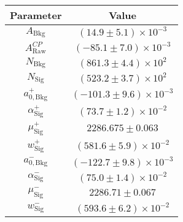 \begin{tabular}{cc}
  \toprule
  Parameter & Value \\
  \midrule
$A_{\mathrm{Bkg}}$ & $(14.9 \pm 5.1) \times 10^{-3}$ \\
$A_{\mathrm{Raw}}^{C\!P}$ & $(-85.1 \pm 7.0) \times 10^{-3}$ \\
$N_{\mathrm{Bkg}}$ & $(861.3 \pm 4.4) \times 10^{2}$ \\
$N_{\mathrm{Sig}}$ & $(523.2 \pm 3.7) \times 10^{2}$ \\
$a_{0,\mathrm{Bkg}}^{+}$ & $(-101.3 \pm 9.6) \times 10^{-3}$ \\
$\alpha_{\mathrm{Sig}}^{+}$ & $(73.7 \pm 1.2) \times 10^{-2}$ \\
$\mu_{\mathrm{Sig}}^{+}$ & $2286.675 \pm 0.063$ \\
$w_{\mathrm{Sig}}^{+}$ & $(581.6 \pm 5.9) \times 10^{-2}$ \\
$a_{0,\mathrm{Bkg}}^{-}$ & $(-122.7 \pm 9.8) \times 10^{-3}$ \\
$\alpha_{\mathrm{Sig}}^{-}$ & $(75.0 \pm 1.4) \times 10^{-2}$ \\
$\mu_{\mathrm{Sig}}^{-}$ & $2286.71 \pm 0.067$ \\
$w_{\mathrm{Sig}}^{-}$ & $(593.6 \pm 6.2) \times 10^{-2}$ \\
  \bottomrule
\end{tabular}